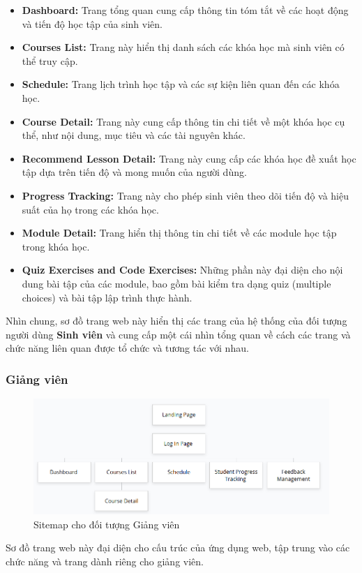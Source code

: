 \begin{itemize}
    \item \textbf{Dashboard:} Trang tổng quan cung cấp thông tin tóm tắt về các hoạt động và tiến độ học tập của sinh viên.
    \item \textbf{Courses List:} Trang này hiển thị danh sách các khóa học mà sinh viên có thể truy cập.
    \item \textbf{Schedule:} Trang lịch trình học tập và các sự kiện liên quan đến các khóa học.
    \item \textbf{Course Detail:} Trang này cung cấp thông tin chi tiết về một khóa học cụ thể, như nội dung, mục tiêu và các tài nguyên khác.
    \item \textbf{Recommend Lesson Detail:} Trang này cung cấp các khóa học đề xuất học tập dựa trên tiến độ và mong muốn của người dùng.
    \item \textbf{Progress Tracking:} Trang này cho phép sinh viên theo dõi tiến độ và hiệu suất của họ trong các khóa học.
    \item \textbf{Module Detail:} Trang hiển thị thông tin chi tiết về các module học tập trong khóa học.
    \item \textbf{Quiz Exercises and Code Exercises:} Những phần này đại diện cho nội dung bài tập của các module, bao gồm bài kiểm tra dạng quiz (multiple choices) và bài tập lập trình thực hành.
\end{itemize}
\par Nhìn chung, sơ đồ trang web này hiển thị các trang của hệ thống của đối tượng người dùng \textbf{Sinh viên} và cung cấp một cái nhìn tổng quan về cách các trang và chức năng liên quan được tổ chức và tương tác với nhau.
\subsubsection{Giảng viên}
\begin{figure}[H]
    \centering
    \includegraphics[scale=0.7]{Images/sitemap/Instructor.png}
    \caption{Sitemap cho đối tượng Giảng viên}
    \label{fig:enter-label}
\end{figure}
\par Sơ đồ trang web này đại diện cho cấu trúc của ứng dụng web, tập trung vào các chức năng và trang dành riêng cho giảng viên.

